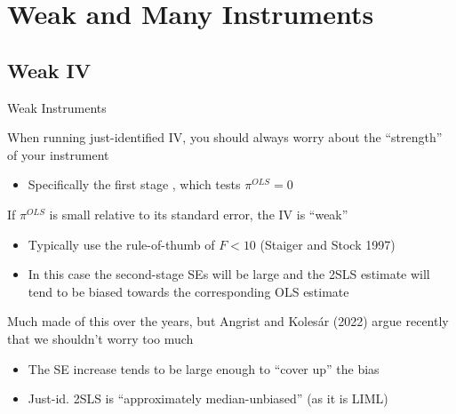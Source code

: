 \documentclass{beamer}
\begin{document}
\section{Weak and Many Instruments}

\subsection{Weak IV}
\begin{frame}{Weak Instruments}

When running just-identified IV, you should always worry about the ``strength'' of your instrument
\begin{itemize}
  \item Specifically the first stage , which tests $\pi^{OLS}=0$ 
\end{itemize}
\smallskip\pause

If $\pi^{OLS}$ is small relative to its standard error, the IV is ``weak''
\begin{itemize}
  \item Typically use the rule-of-thumb of $F<10$ (Staiger and Stock 1997)
  \item In this case the second-stage SEs will be large and the 2SLS estimate will tend to be biased towards the corresponding OLS estimate
\end{itemize}\pause

Much made of this over the years, but Angrist and Koles\'{a}r (2022) argue recently that we shouldn't worry too much
\begin{itemize}
  \item The SE increase tends to be large enough to ``cover up'' the bias
  \item Just-id. 2SLS is ``approximately median-unbiased'' (as it is LIML)
\end{itemize}

\end{frame}
\end{document}
